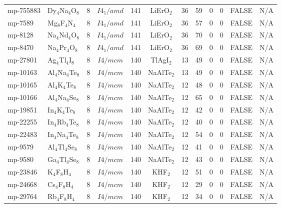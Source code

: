 {\begin{longtable}{llcccccccccc}
    mp-755883 & Dy$_{4}$Na$_{4}$O$_{8}$ & 8     & $I4_1/amd$ & 141   & LiErO$_{2}$ & 36    & 59    & 0     & 0     & FALSE & N/A \\
    mp-7589 & Mg$_{8}$F$_{4}$N$_{4}$ & 8     & $I4_1/amd$ & 141   & LiErO$_{2}$ & 36    & 57    & 0     & 0     & FALSE & N/A \\
    mp-8128 & Na$_{4}$Nd$_{4}$O$_{8}$ & 8     & $I4_1/amd$ & 141   & LiErO$_{2}$ & 36    & 70    & 0     & 0     & FALSE & N/A \\
    mp-8470 & Na$_{4}$Pr$_{4}$O$_{8}$ & 8     & $I4_1/amd$ & 141   & LiErO$_{2}$ & 36    & 69    & 0     & 0     & FALSE & N/A \\
    mp-27801 & Ag$_{4}$Tl$_{4}$I$_{8}$ & 8     & $I4/mcm$ & 140   & TlAgI$_{2}$ & 13    & 49    & 0     & 0     & FALSE & N/A \\
    mp-10163 & Al$_{4}$Na$_{4}$Te$_{8}$ & 8     & $I4/mcm$ & 140   & NaAlTe$_{2}$ & 13    & 49    & 0     & 0     & FALSE & N/A \\
    mp-10165 & Al$_{4}$K$_{4}$Te$_{8}$ & 8     & $I4/mcm$ & 140   & NaAlTe$_{2}$ & 12    & 48    & 0     & 0     & FALSE & N/A \\
    mp-10166 & Al$_{4}$Na$_{4}$Se$_{8}$ & 8     & $I4/mcm$ & 140   & NaAlTe$_{2}$ & 12    & 65    & 0     & 0     & FALSE & N/A \\
    mp-19851 & In$_{4}$K$_{4}$Te$_{8}$ & 8     & $I4/mcm$ & 140   & NaAlTe$_{2}$ & 12    & 42    & 0     & 0     & FALSE & N/A \\
    mp-22255 & In$_{4}$Rb$_{4}$Te$_{8}$ & 8     & $I4/mcm$ & 140   & NaAlTe$_{2}$ & 12    & 40    & 0     & 0     & FALSE & N/A \\
    mp-22483 & In$_{4}$Na$_{4}$Te$_{8}$ & 8     & $I4/mcm$ & 140   & NaAlTe$_{2}$ & 12    & 54    & 0     & 0     & FALSE & N/A \\
    mp-9579 & Al$_{4}$Tl$_{4}$Se$_{8}$ & 8     & $I4/mcm$ & 140   & NaAlTe$_{2}$ & 12    & 41    & 0     & 0     & FALSE & N/A \\
    mp-9580 & Ga$_{4}$Tl$_{4}$Se$_{8}$ & 8     & $I4/mcm$ & 140   & NaAlTe$_{2}$ & 12    & 43    & 0     & 0     & FALSE & N/A \\
    mp-23846 & K$_{4}$F$_{8}$H$_{4}$ & 8     & $I4/mcm$ & 140   & KHF$_{2}$ & 12    & 51    & 0     & 0     & FALSE & N/A \\
    mp-24668 & Cs$_{4}$F$_{8}$H$_{4}$ & 8     & $I4/mcm$ & 140   & KHF$_{2}$ & 12    & 29    & 0     & 0     & FALSE & N/A \\
    mp-29764 & Rb$_{4}$F$_{8}$H$_{4}$ & 8     & $I4/mcm$ & 140   & KHF$_{2}$ & 12    & 34    & 0     & 0     & FALSE & N/A \\

\end{longtable}}
